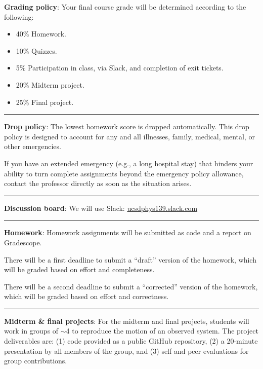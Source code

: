 \documentclass[12pt]{article}
\begin{document}
\noindent\textbf{Grading policy}: Your final course grade will be determined according to the following:
\begin{itemize}
  \item 40\% Homework.
  \item 10\% Quizzes.
  \item 5\% Participation in class, via Slack, and completion of exit tickets.
  \item 20\% Midterm project.
  \item 25\% Final project.
\end{itemize}

\begin{center}
  \rule{\textwidth}{0.5pt}
\end{center}

\noindent\textbf{Drop policy}: The lowest homework score is dropped automatically.
This drop policy is designed to account for any and all illnesses, family, medical, mental, or other emergencies.

If you have an extended emergency (e.g., a long hospital stay) that hinders your ability to turn complete assignments beyond the emergency policy allowance, contact the professor directly as soon as the situation arises.

\begin{center}
  \rule{\textwidth}{0.5pt}
\end{center}

\noindent\textbf{Discussion board}: We will use Slack: \href{https://join.slack.com/t/ucsdphys139/shared\_invite/zt-110gwd4lx-pZBsItfcxhbOD5BV6afVDA}{ucsdphys139.slack.com}

\begin{center}
  \rule{\textwidth}{0.5pt}
\end{center}


\noindent\textbf{Homework}: Homework assignments will be submitted as code and a report on Gradescope.

There will be a first deadline to submit a ``draft'' version of the homework, which will be graded based on effort and completeness.

There will be a second deadline to submit a ``corrected'' version of the homework, which will be graded based on effort and correctness.

\begin{center}
  \rule{\textwidth}{0.5pt}
\end{center}

\noindent\textbf{Midterm \& final projects}:
For the midterm and final projects, students will work in groups of $\sim$4 to reproduce the motion of an observed system.
The project deliverables are: (1) code provided as a public GitHub repository, (2) a 20-minute presentation by all members of the group, and (3) self and peer evaluations for group contributions.
\end{document}
